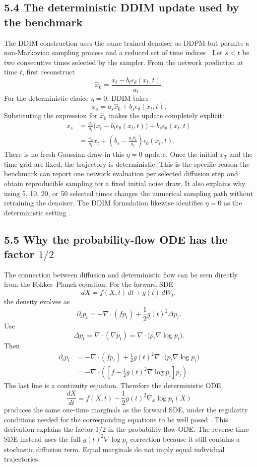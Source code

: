 \documentclass[11pt]{article}
\begin{document}
\subsection*{5.4 The deterministic DDIM update used by the benchmark}

The DDIM construction uses the same trained denoiser as DDPM but permits a
non-Markovian sampling process and a reduced set of time indices
\cite{song2021ddim}. Let $s<t$ be two consecutive times selected by the sampler.
From the network prediction at time $t$, first reconstruct
\[
 \hat x_0
 =\frac{x_t-b_t\epsilon_\theta(x_t,t)}{a_t}.
\]
For the deterministic choice $\eta=0$, DDIM takes
\[
 \boxed{
 x_s=a_s\hat x_0+b_s\epsilon_\theta(x_t,t)
 }.
\]
Substituting the expression for $\hat x_0$ makes the update completely explicit:
\begin{align*}
 x_s
 &=\frac{a_s}{a_t}
 \big(x_t-b_t\epsilon_\theta(x_t,t)\big)
 +b_s\epsilon_\theta(x_t,t)\\
 &=\frac{a_s}{a_t}x_t
 +\left(b_s-\frac{a_sb_t}{a_t}\right)
 \epsilon_\theta(x_t,t).
\end{align*}
There is no fresh Gaussian draw in this $\eta=0$ update. Once the initial
$x_T$ and the time grid are fixed, the trajectory is deterministic. This is the
specific reason the benchmark can report one network evaluation per selected
diffusion step and obtain reproducible sampling for a fixed initial noise draw.
It also explains why using 5, 10, 20, or 50 selected times changes the numerical
sampling path without retraining the denoiser. The DDIM formulation likewise identifies $\eta=0$ as the deterministic setting
\cite{song2021ddim}.

\subsection*{5.5 Why the probability-flow ODE has the factor $1/2$}

The connection between diffusion and deterministic flow can be seen directly
from the Fokker--Planck equation. For the forward SDE
\[
 dX=f(X,t)\,dt+g(t)\,dW_t,
\]
the density evolves as
\[
 \partial_t p_t
 =-\nabla\!\cdot(f p_t)+\frac12g(t)^2\Delta p_t.
\]
Use
\[
 \Delta p_t
 =\nabla\!\cdot(\nabla p_t)
 =\nabla\!\cdot\big(p_t\nabla\log p_t\big).
\]
Then
\begin{align*}
 \partial_t p_t
 &=-\nabla\!\cdot(f p_t)
 +\frac12g(t)^2
 \nabla\!\cdot\big(p_t\nabla\log p_t\big)\\
 &=-\nabla\!\cdot\left(
 \left[f-\frac12g(t)^2\nabla\log p_t\right]p_t
 \right).
\end{align*}
The last line is a continuity equation. Therefore the deterministic ODE
\[
 \boxed{
 \frac{dX}{dt}
 =f(X,t)-\frac12g(t)^2\nabla_x\log p_t(X)
 }
\]
produces the same one-time marginals as the forward SDE, under the regularity
conditions needed for the corresponding equations to be well posed
\cite{song2021sde}. This derivation explains the factor $1/2$ in the
probability-flow ODE. The reverse-time SDE instead uses the full
$g(t)^2\nabla\log p_t$ correction because it still contains a stochastic
diffusion term. Equal marginals do not imply equal individual trajectories.
\end{document}
